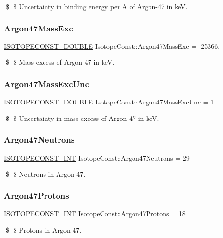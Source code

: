 \$ \$ Uncertainty in binding energy per A of Argon-\/47 in keV. \mbox{\label{group___isotope_const-_argon-_ar47_gab8879c2709823cd127a3f5c9bc143e8e}} 
\subsubsection{\texorpdfstring{Argon47\+Mass\+Exc}{Argon47MassExc}}
{\footnotesize\ttfamily \mbox{\hyperlink{group___isotope_const-_macros_ga8f45a7272ce02c0b4c65c44636ed719a}{I\+S\+O\+T\+O\+P\+E\+C\+O\+N\+S\+T\+\_\+\+D\+O\+U\+B\+LE}} Isotope\+Const\+::\+Argon47\+Mass\+Exc = -\/25366.}

\$ \$ Mass excess of Argon-\/47 in keV. \mbox{\label{group___isotope_const-_argon-_ar47_gad8a577a9f0e9bb728ac2f1394bff77df}} 
\subsubsection{\texorpdfstring{Argon47\+Mass\+Exc\+Unc}{Argon47MassExcUnc}}
{\footnotesize\ttfamily \mbox{\hyperlink{group___isotope_const-_macros_ga8f45a7272ce02c0b4c65c44636ed719a}{I\+S\+O\+T\+O\+P\+E\+C\+O\+N\+S\+T\+\_\+\+D\+O\+U\+B\+LE}} Isotope\+Const\+::\+Argon47\+Mass\+Exc\+Unc = 1.}

\$ \$ Uncertainty in mass excess of Argon-\/47 in keV. \mbox{\label{group___isotope_const-_argon-_ar47_ga4c97ebd3ae0d46f7599da4e14c854230}} 
\subsubsection{\texorpdfstring{Argon47\+Neutrons}{Argon47Neutrons}}
{\footnotesize\ttfamily \mbox{\hyperlink{group___isotope_const-_macros_ga5f18360b3e99483a35c32d789e62621c}{I\+S\+O\+T\+O\+P\+E\+C\+O\+N\+S\+T\+\_\+\+I\+NT}} Isotope\+Const\+::\+Argon47\+Neutrons = 29}

\$ \$ Neutrons in Argon-\/47. \mbox{\label{group___isotope_const-_argon-_ar47_ga4ee1d37e19c9b02303c98bcdec2d145d}} 
\subsubsection{\texorpdfstring{Argon47\+Protons}{Argon47Protons}}
{\footnotesize\ttfamily \mbox{\hyperlink{group___isotope_const-_macros_ga5f18360b3e99483a35c32d789e62621c}{I\+S\+O\+T\+O\+P\+E\+C\+O\+N\+S\+T\+\_\+\+I\+NT}} Isotope\+Const\+::\+Argon47\+Protons = 18}

\$ \$ Protons in Argon-\/47. 
